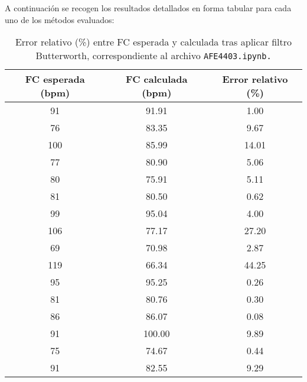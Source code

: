 A continuación se recogen los resultados detallados en forma tabular para cada uno de los métodos evaluados:



\begin{table}[H]
\centering
\begin{tabular}{|c|c|c|}
\hline
\textbf{FC esperada (bpm)} & \textbf{FC calculada (bpm)} & \textbf{Error relativo (\%)} \\
\hline
91 & 91.91 & 1.00 \\
\hline
76 & 83.35 & 9.67 \\
\hline
100 & 85.99 & 14.01 \\
\hline
77 & 80.90 & 5.06 \\
\hline
80 & 75.91 & 5.11 \\
\hline
81 & 80.50 & 0.62 \\
\hline
99 & 95.04 & 4.00 \\
\hline
106 & 77.17 & 27.20 \\
\hline
69 & 70.98 & 2.87 \\
\hline
119 & 66.34 & 44.25 \\
\hline
95 & 95.25 & 0.26 \\
\hline
81 & 80.76 & 0.30 \\
\hline
86 & 86.07 & 0.08 \\
\hline
91 & 100.00 & 9.89 \\
\hline
75 & 74.67 & 0.44 \\
\hline
91 & 82.55 & 9.29 \\
\hline
\end{tabular}
\caption{Error relativo (\%) entre FC esperada y calculada tras aplicar filtro Butterworth, correspondiente al archivo \texttt{AFE4403.ipynb.}}
\label{tabla:fc_afe4403_error_relativo}
\end{table}



